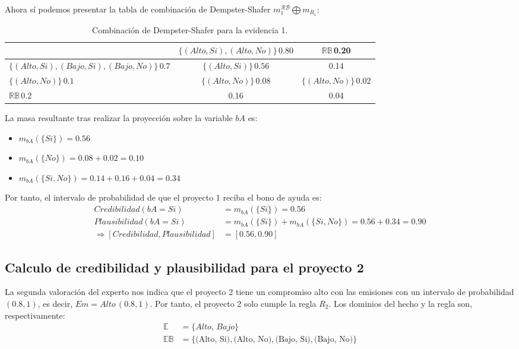 \documentclass[11pt,a4paper]{article}
\begin{document}
Ahora sí podemos presentar la tabla de combinación de Dempster-Shafer $m_{1}^{\mathcal{RB}}\bigoplus m_{R_1}$:
\begin{table}[H]
    \centering
    \begin{tabular}{l|c|c}
         & $\{(Alto, Si), (Alto, No)\}\,0.80$ & $\mathbb{RB}$\,0.20 \\
        \hline
        $\{(Alto,Si), (Bajo, Si), (Bajo, No)\}\,0.7$ & $\{(Alto, Si)\}\,0.56$ & 0.14 \\
        \hline
        $\{(Alto,No)\}\,0.1$ & $\{(Alto, No)\}\,0.08$ & $\{(Alto, No)\}\,0.02$ \\
        \hline
        $\mathbb{RB}\,0.2$ & 0.16 & 0.04 \\
    \end{tabular}
    \caption{Combinación de Dempster-Shafer para la evidencia 1.}
    \label{tab:ds_proyecto1}
\end{table}

La masa resultante tras realizar la proyección sobre la variable $bA$ es:
\begin{itemize}[leftmargin=2em, topsep=1ex]
    \item $m_{bA}(\{Si\}) = 0.56$
    \item $m_{bA}(\{No\}) = 0.08 + 0.02 = 0.10$
    \item $m_{bA}(\{Si, No\}) = 0.14 + 0.16 + 0.04 = 0.34$
\end{itemize}

Por tanto, el intervalo de probabilidad de que el proyecto 1 reciba el bono de ayuda es:
\begin{align*}
    Credibilidad(bA=Si) &= m_{bA}(\{Si\}) = 0.56 \\
    Plausibilidad(bA=Si) &= m_{bA}(\{Si\}) + m_{bA}(\{Si, No\}) = 0.56 + 0.34 = 0.90 \\
    \Rightarrow [Credibilidad, Plausibilidad] &= [0.56, 0.90]
\end{align*}

\subsection*{Calculo de credibilidad y plausibilidad para el proyecto 2}

La segunda valoración del experto nos indica que el proyecto 2 tiene un compromiso alto con las emisiones
con un intervalo de probabilidad $(0.8, 1)$, es decir, $Em=Alto\, (0.8, 1)$. Por tanto, el proyecto 2 solo cumple la
regla $R_2$. Los dominios del hecho y la regla son, respectivamente:
\begin{align*}
\mathbb{E}&=\{Alto,\, Bajo\} \\
\mathbb{EB}&=\{\text{(Alto, Si)}, \text{(Alto, No)}, \text{(Bajo, Si)}, \text{(Bajo, No)}\}
\end{align*}
\end{document}
